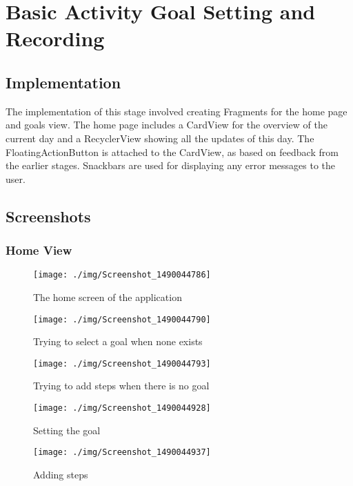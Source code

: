 \documentclass[report.tex]{subfiles}
\begin{document}
\section{Basic Activity Goal Setting and Recording} %
\label{sec:basic_activity_goal_setting_and_recording}
\subsection{Implementation} %
\label{sub:implementation_1}
The implementation of this stage involved creating Fragments for the home page
and goals view. The home page includes a CardView for the overview of the
current day and a RecyclerView showing all the updates of this day. The
FloatingActionButton is attached to the CardView, as based on feedback from the
earlier stages. Snackbars are used for displaying any error messages to the
user.

\subsection{Screenshots} %
\label{sub:screenshots_1}
\subsubsection{Home View} %
\label{ssub:home_view}
\begin{figure}[H]
    \centering
    \texttt{[image: ./img/Screenshot\_1490044786]}
    \caption{The home screen of the application}
\end{figure}

\begin{figure}[H]
    \centering
    \texttt{[image: ./img/Screenshot\_1490044790]}
    \caption{Trying to select a goal when none exists}
\end{figure}

\begin{figure}[H]
    \centering
    \texttt{[image: ./img/Screenshot\_1490044793]}
    \caption{Trying to add steps when there is no goal}
\end{figure}

\begin{figure}[H]
    \centering
    \texttt{[image: ./img/Screenshot\_1490044928]}
    \caption{Setting the goal}
\end{figure}

\begin{figure}[H]
    \centering
    \texttt{[image: ./img/Screenshot\_1490044937]}
    \caption{Adding steps}
\end{figure}
\end{document}
